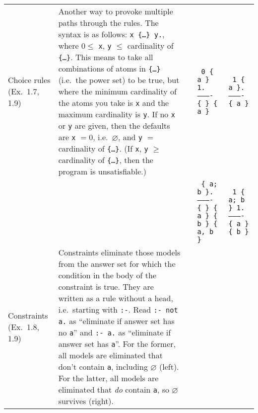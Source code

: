 \documentclass[10pt,a4paper,landscape]{article}
\begin{document}
\begin{longtable}{p{3cm}p{13.5cm}lp{4cm}p{4cm}}
	Choice rules \newline (Ex.\ 1.7, 1.9)
		& Another way to provoke multiple paths through the rules.
		The syntax is as follows: \newline \texttt{x \{\ldots \} y.}, where $0 \leq$ \texttt{x}, \texttt{y} $\leq$ cardinality of \texttt{\{\ldots \}}. 
		This means to take all combinations of atoms in \texttt{\{\ldots \}} (i.e.\ the power set) to be true, but where the minimum cardinality of the atoms you take is \texttt{x} and the maximum cardinality is \texttt{y}. 
		If no \texttt{x} or \texttt{y} are given, then the defaults are \texttt{x} $ = 0$, i.e.\ $\varnothing$, and \texttt{y} $=$ cardinality of \texttt{\{\ldots \}}.
		(If \texttt{x}, \texttt{y} $\geq$ cardinality of \texttt{\{\ldots \}}, then the program is unsatisfiable.)
		&& \texttt{%
			0 \{ a \} 1. \newline
			---------- \newline
			\{ \} \newline
			\{ a \} }
		& \texttt{%
			1 \{ a \}. \newline
			---------- \newline
			\{ a \} }\\
		
		&&& \texttt{%
			\{ a; b \}. \newline
			---------- \newline
			\{ \} \newline
			\{ a \} \newline
			\{ b \} \newline
			\{ a, b \} }
		& \texttt{%
			1 \{ a; b \} 1. \newline
			---------- \newline
			\{ a \} \newline
			\{ b \} }\\ \midrule
		
	Constraints \newline (Ex.\ 1.8, 1.9)
		& Constraints eliminate those models from the answer set for which the condition in the body of the constraint is true.
		They are written as a rule without a head, i.e.\ starting with \texttt{:-}.
		Read \texttt{:- not a.} as ``eliminate if answer set has no \texttt{a}'' and \texttt{:- a.} as ``eliminate if answer set has \texttt{a}''.
		For the former, all models are eliminated that don't contain \texttt{a}, including $\varnothing$ (left).
		For the latter, all models are eliminated that \textit{do} contain \texttt{a}, so $\varnothing$ survives (right).


\end{longtable}
\end{document}
